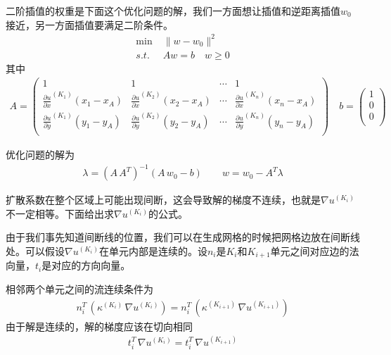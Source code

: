 \documentclass[12pt,a4paper]{article}
\begin{document}
二阶插值的权重是下面这个优化问题的解，我们一方面想让插值和逆距离插值$w_0$接近，另一方面插值要满足二阶条件。
\begin{align*}
\min & \; \|w - w_0\|^2 \\
s.t. & \; A w = b \quad w \geq 0
\end{align*}
其中
\begin{align*}
A = \left(
\begin{matrix}
1 & 1 & \cdots & 1 \\
\frac{\partial u}{\partial x}^{(K_1)} (x_1 - x_A) & \frac{\partial u}{\partial x}^{(K_2)} (x_2 - x_A) & \cdots & \frac{\partial u}{\partial x}^{(K_n)} (x_n - x_A) \\
\frac{\partial u}{\partial y}^{(K_1)} (y_1 - y_A) & \frac{\partial u}{\partial y}^{(K_2)} (y_2 - y_A) & \cdots & \frac{\partial u}{\partial y}^{(K_n)} (y_n - y_A) \\
\end{matrix}
\right)
\quad
b = \left(
\begin{matrix}
1 \\
0 \\
0 \\
\end{matrix}
\right)
\end{align*}

优化问题的解为
\begin{align*}
\lambda = (A \, A^T)^{-1} (A \, w_0 - b) \qquad w = w_0 - A^T \lambda
\end{align*}

扩散系数在整个区域上可能出现间断，这会导致解的梯度不连续，也就是$\nabla u^{(K_i)}$不一定相等。下面给出求$\nabla u^{(K_i)}$的公式。

由于我们事先知道间断线的位置，我们可以在生成网格的时候把网格边放在间断线处。可以假设$\nabla u^{(K_i)}$在单元内部是连续的。设$n_i$是$K_i$和$K_{i+1}$单元之间对应边的法向量，$t_i$是对应的方向向量。

相邻两个单元之间的流连续条件为
\begin{align*}
n_i^T \, (\kappa^{(K_i)} \, \nabla u^{(K_i)}) = n_i^T \, (\kappa^{(K_{i+1})} \, \nabla u^{(K_{i+1})})
\end{align*}
由于解是连续的，解的梯度应该在切向相同
\begin{align*}
t_i^T \, \nabla u^{(K_i)} = t_i^T \, \nabla u^{(K_{i+1})}
\end{align*}
\end{document}
